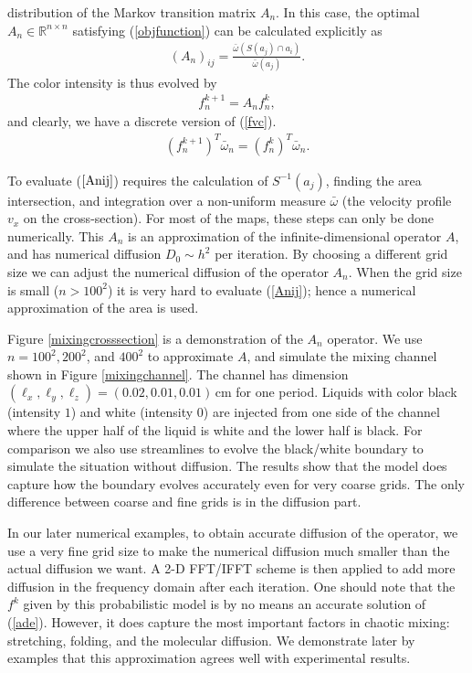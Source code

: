 distribution of the Markov transition matrix $A_n$. In this case, the
optimal $A_n\in \mathbb{R}^{n \times n}$ satisfying
(\ref{objfunction}) can be calculated explicitly as
  \begin{eqnarray}
    \label{Anij}
    (A_n)_{ij} =  \frac{\bar{\omega}(S(a_j)\cap a_i)}{\bar{\omega}(a_j)}.
   \end{eqnarray}
The color intensity is thus evolved by
\begin{eqnarray}
     f_n^{k+1} = A_n f^k_n,
\end{eqnarray}
and clearly, we have a discrete version of (\ref{fvc}).
\begin{eqnarray}
     (f_n^{k+1})^T \bar{\omega}_n=  (f^k_n)^T \bar{\omega}_n.
\end{eqnarray}




To evaluate ($\ref{Anij}$) requires the calculation of $S^{-1}(a_j)$,
finding the area intersection, and integration over a non-uniform
measure $\bar{\omega}$ (the velocity profile $v_x$ on the cross-section). For most of the maps, these steps can only be done numerically. This $A_n$ is an approximation of the infinite-dimensional operator $A$, and has numerical diffusion $D_0 \sim h^2$
per iteration. By choosing a different grid size we can adjust the
numerical diffusion of the operator $A_n$. When the grid size is small
($n>100^2$) it is very hard to evaluate (\ref{Anij}); hence a numerical
approximation of the area is used.


Figure \ref{mixingcrosssection} is a demonstration of the $A_n$
operator. We use $n= 100^2, 200^2$, and $400^2$ to approximate $A$,
and simulate the mixing channel shown in Figure \ref{mixingchannel}.
The channel has dimension $(\ell_x,\ell_y,\ell_z) =
(0.02,0.01,0.01)\,\text{cm}$ for one period. Liquids with color black
(intensity $1$) and white (intensity $0$) are injected from one side
of the channel where the upper half of the liquid is white and the
lower half is black. For comparison we also use streamlines to evolve
the black/white boundary to simulate the situation without diffusion.
The results show that the model does capture how the boundary evolves
accurately even for very coarse grids. The only difference between
coarse and fine grids is in the diffusion part.

In our later numerical examples, to obtain accurate diffusion of the
operator, we use a very fine grid size to make the numerical diffusion
much smaller than the actual diffusion we want. A 2-D FFT/IFFT
scheme is then applied to add more diffusion in the frequency domain after
each iteration. One should note that the $f^k$ given by this
probabilistic model is by no means an accurate solution of
(\ref{ade}). However, it does capture the most important factors in
chaotic mixing: stretching, folding, and the molecular diffusion. We
demonstrate later by examples that this approximation agrees
well with experimental results.


